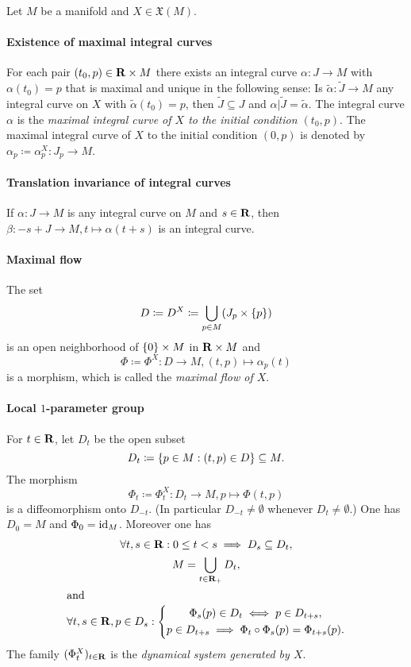 \begin{thm}
  Let $M$ be a manifold and $X \in \mathfrak X(M)$.
  \paragraph{Existence of maximal integral curves}
  For each pair $(t_0, p) \in \mathbf{R} \times M$ there exists an integral curve
  $\alpha\colon J \to M$ with $\alpha(t_0) = p$ that is maximal and unique in the
  following sense: Is $\widetilde\alpha\colon \widetilde J \to M$ any integral
  curve on $X$ with $\widetilde \alpha(t_0) = p$, then $\widetilde J \subseteq
  J$ and $\alpha|\widetilde J = \widetilde \alpha$. The integral curve $\alpha$
  is the \emph{maximal integral curve of $X$ to the initial condition $(t_0, p)$}.
  The maximal integral curve of $X$ to the initial condition $(0, p)$ is denoted
  by $\alpha_p \coloneqq \alpha_p^X\colon J_p \to M$.
  
  \paragraph{Translation invariance of integral curves}
  If $\alpha\colon J \to M$ is any integral curve on $M$ and $s \in \mathbf{R}$, then
  $\beta\colon -s + J \to M, t \mapsto \alpha(t + s)$ is an integral curve.
  
  \paragraph{Maximal flow}
  The set
  \[
    D \coloneqq D^X \coloneqq \bigcup_{p \in M} (J_p \times \lbrace p\rbrace)
  \]
  is an open neighborhood of $\lbrace0\rbrace \times M$ in $\mathbf{R} \times M$ and
  \[
    \Phi \coloneqq \Phi^X\colon D \to M, (t, p) \mapsto \alpha_p(t)
  \]
  is a morphism, which is called the \emph{maximal flow of $X$}.

  \paragraph{Local $1$-parameter group}
  For $t \in \mathbf{R}$, let $D_t$ be the open subset
  \[ 
    D_t \coloneqq \lbrace p \in M : (t, p) \in D\rbrace \subseteq M.
  \]
  The morphism
  \[
    \Phi_t \coloneqq \Phi_t^X\colon D_t \to M, p \mapsto \Phi(t, p)
  \]
  is a diffeomorphism onto $D_{-t}$. (In particular $D_{-t} \neq \emptyset$
  whenever $D_t \neq \emptyset$.)
  One has $D_0 = M$ and $\Phi_0 = \mathrm{id}_M$. Moreover one has
  \begin{gather*}
    \forall t, s \in \mathbf{R}: 0 \leq t < s \implies D_s \subseteq D_t,\\
    M = \bigcup_{t \in \mathbf{R}_+} D_t, \\
    \intertext{and}
    \forall t, s \in \mathbf{R}, p \in D_s:
      \left\{\begin{gathered}
        \Phi_s(p) \in D_t \iff p \in D_{t + s},\\
        p \in D_{t + s} \implies \Phi_t \circ \Phi_s(p) = \Phi_{t + s}(p).
      \end{gathered}\right.
  \end{gather*}
  The family $(\Phi^X_t)_{t \in \mathbf{R}}$ is the \emph{dynamical system generated
  by $X$}.
\end{thm}

